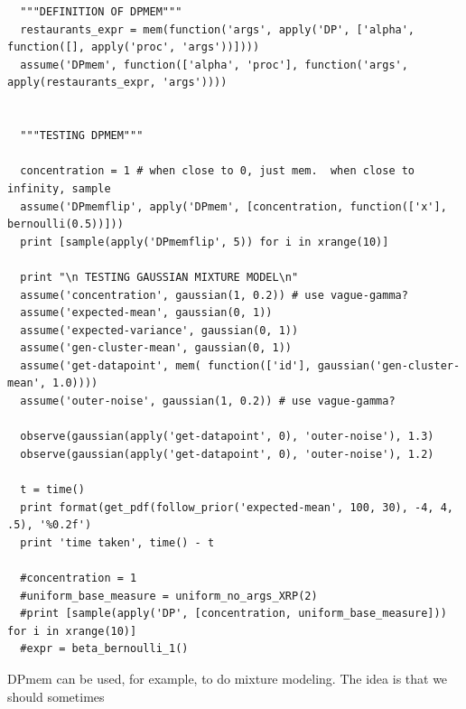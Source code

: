 \documentclass[11pt]{article}
\begin{document}
\begin{small}
\begin{verbatim}
  """DEFINITION OF DPMEM"""
  restaurants_expr = mem(function('args', apply('DP', ['alpha', function([], apply('proc', 'args'))])))
  assume('DPmem', function(['alpha', 'proc'], function('args', apply(restaurants_expr, 'args'))))


  """TESTING DPMEM"""

  concentration = 1 # when close to 0, just mem.  when close to infinity, sample 
  assume('DPmemflip', apply('DPmem', [concentration, function(['x'], bernoulli(0.5))]))
  print [sample(apply('DPmemflip', 5)) for i in xrange(10)]

  print "\n TESTING GAUSSIAN MIXTURE MODEL\n"
  assume('concentration', gaussian(1, 0.2)) # use vague-gamma? 
  assume('expected-mean', gaussian(0, 1)) 
  assume('expected-variance', gaussian(0, 1))
  assume('gen-cluster-mean', gaussian(0, 1))
  assume('get-datapoint', mem( function(['id'], gaussian('gen-cluster-mean', 1.0))))
  assume('outer-noise', gaussian(1, 0.2)) # use vague-gamma?

  observe(gaussian(apply('get-datapoint', 0), 'outer-noise'), 1.3)
  observe(gaussian(apply('get-datapoint', 0), 'outer-noise'), 1.2)

  t = time()
  print format(get_pdf(follow_prior('expected-mean', 100, 30), -4, 4, .5), '%0.2f')
  print 'time taken', time() - t

  #concentration = 1
  #uniform_base_measure = uniform_no_args_XRP(2)
  #print [sample(apply('DP', [concentration, uniform_base_measure])) for i in xrange(10)]
  #expr = beta_bernoulli_1()

\end{verbatim}
\end{small}


DPmem can be used, for example, to do mixture modeling.  The idea is that we should sometimes


\pagebreak

\begin{thebibliography}{99}



\end{thebibliography}
\end{document}
